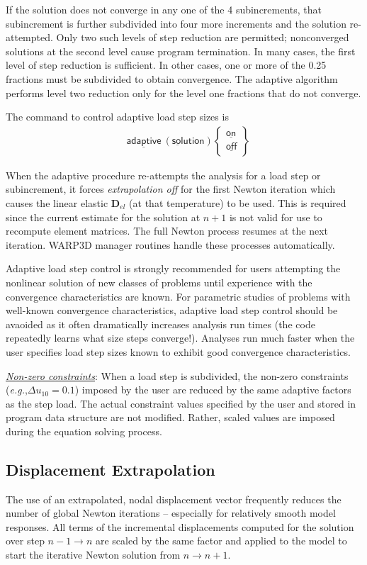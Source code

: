 \documentclass[11pt]{report}
\numberwithin{equation}{section}
\newcommand{\nin} {\noindent}
\newcommand{\ul} {\underline}
\newcommand{\hv} {\mathsf}   %
\newcommand{\eg}{\emph{e.g.},\xspace}
\newcommand{\ti}{\emph}
\begin{document}
If the solution does not converge in any one of the 4 subincrements, that subincrement is 
further subdivided into four more increments and the solution re-attempted. Only two such levels
of step reduction are permitted; nonconverged solutions at the second level cause program 
termination. In many cases, the first level of step reduction is sufficient. In other cases, one or 
more of the 0.25 fractions must be subdivided to obtain convergence. The adaptive algorithm 
performs level two reduction only for the level one fractions that do not converge.

The command to control adaptive load step sizes is
\begin{align*}
&\hv{\ul{adaptive}\  (\ul{sol}ution) }
\begin{Bmatrix}
\hv{\ul{on}}\\ \hv{\ul{off}}
\end{Bmatrix}
\end{align*}

When the adaptive procedure re-attempts the analysis for a load step or subincrement, it forces 
\ti{extrapolation off} for the first Newton iteration which causes the linear
elastic $\mathbf{D}_{el}$ (at that temperature) to be used. This is required 
since the current estimate for the solution at $n+1$ is not valid for use to recompute element 
matrices. The full Newton process resumes at the next iteration. WARP3D manager routines 
handle these processes automatically.

Adaptive load step control is strongly recommended for users attempting the nonlinear solution 
of new classes of problems until experience with the convergence characteristics are known. 
For parametric studies of problems with well-known convergence characteristics, adaptive 
load step control should be avaoided as it often dramatically increases analysis run times 
(the code repeatedly learns what size steps converge!). Analyses run much faster when 
the user specifies load step sizes known to exhibit good convergence characteristics.

\nin \ti{\ul{Non-zero constraints}}: When a load step is subdivided, the non-zero constraints 
(\eg $\Delta u_{10}=0.1$) imposed by the user are reduced by the same adaptive factors as 
the step load. The actual constraint values specified by the user and stored in program 
data structure are not modified. Rather, scaled values are imposed during the equation 
solving process.

\subsection{Displacement Extrapolation}
\nin The use of an extrapolated, nodal  displacement vector frequently reduces the 
number of global Newton iterations -- especially for relatively
smooth model responses. All terms of the incremental displacements 
computed for the solution over
step $n-1\rightarrow n$ are scaled by the same factor and applied to the model to start 
the iterative Newton solution from $n\rightarrow n+1$. 
\end{document}
